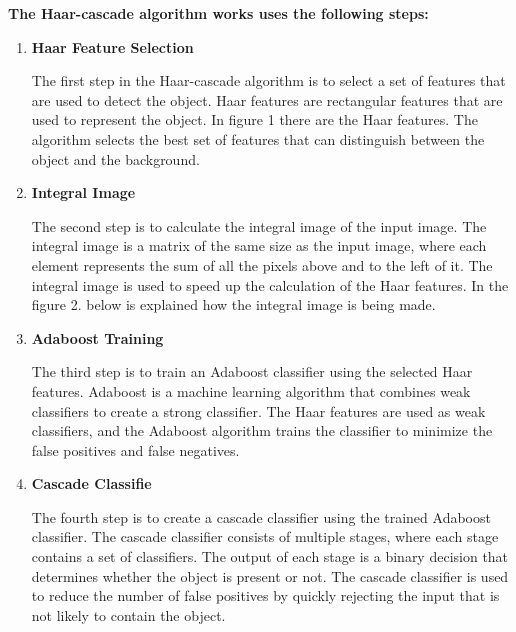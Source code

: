         \textbf{The Haar-cascade algorithm works uses the following steps:}
        \begin{enumerate}
            
            \item \textbf{Haar Feature Selection}
        
            The first step in the Haar-cascade algorithm is to select a set of features that are used to detect the object. 
            Haar features are rectangular features that are used to represent the object. In figure 1 there are the Haar features. 
            The algorithm selects the best set of features that can distinguish between the object and the background.
                
            \item \textbf{Integral Image}
        
            The second step is to calculate the integral image of the input image. The integral image is a matrix of the same size as the input image, where each element represents the sum of all the pixels above and to the left of it. 
            The integral image is used to speed up the calculation of the Haar features. 
            In the figure 2. below is explained how the integral image is being made.
            
            \item \textbf{Adaboost Training}
        
            The third step is to train an Adaboost classifier using the selected Haar features. 
            Adaboost is a machine learning algorithm that combines weak classifiers to create a strong classifier. 
            The Haar features are used as weak classifiers, and the Adaboost algorithm trains the classifier to minimize the false positives and false negatives.
        
            \item \textbf{Cascade Classifie}
        
            The fourth step is to create a cascade classifier using the trained Adaboost classifier. 
            The cascade classifier consists of multiple stages, where each stage contains a set of classifiers. 
            The output of each stage is a binary decision that determines whether the object is present or not. 
            The cascade classifier is used to reduce the number of false positives by quickly rejecting the input that is not likely to contain the object.

        \end{enumerate}


